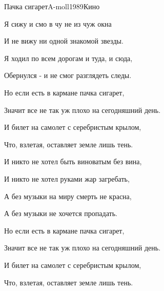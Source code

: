 \begin{song}{Пачка сигарет}{A-moll}{1989}{Кино}{}{}

  \begin{SBVerse}
    Я сижу и смо в чу не из чуж окна

    И не вижу ни одной знакомой звезды.

    Я ходил по всем дорогам и туда, и сюда,

    Обернулся - и не смог разглядеть следы.
  \end{SBVerse}

  \begin{SBChorus}
    Но если есть в кармане пачка сигарет,

    Значит все не так уж плохо на сегодняшний день.

    И билет на самолет с серебристым крылом,

    Что, взлетая, оставляет земле лишь тень.
  \end{SBChorus}

  \begin{SBVerse}
    И никто не хотел быть виноватым без вина,

    И никто не хотел руками жар загребать,

    А без музыки на миру смерть не красна,

    А без музыки не хочется пропадать.
  \end{SBVerse}

  \begin{SBChorus}
    Но если есть в кармане пачка сигарет,

    Значит все не так уж плохо на сегодняшний день.

    И билет на самолет с серебристым крылом,

    Что, взлетая, оставляет земле лишь тень.
  \end{SBChorus}

\end{song}
